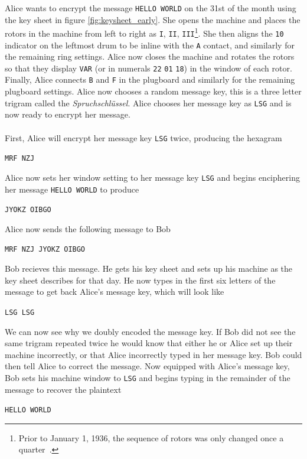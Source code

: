 \noindent Alice wants to encrypt the message \texttt{HELLO WORLD} on
the 31st of the month using the key sheet in figure
\ref{fig:keysheet_early}. She opens the machine and places the rotors in
the machine from left to right as \texttt{I}, \texttt{II},
\texttt{III}\footnote{Prior to January 1, 1936, the sequence of
rotors was only changed once a quarter~\cite[p.~223]{Rejewski1980}.}. She then aligns the
\texttt{10} indicator on the
leftmost drum to be inline with the \texttt{A} contact, and similarly
for the remaining ring settings. Alice now closes the machine and
rotates the rotors so that they display \texttt{VAR} (or in numerals
\texttt{22} \texttt{01} \texttt{18}) in the window of
each rotor. Finally, Alice connects \texttt{B} and \texttt{F} in the
plugboard and similarly for the remaining plugboard settings. Alice
now chooses a random message key, this is a three letter trigram
called the \emph{Spruchschlüssel}. Alice chooses her message key as
\texttt{LSG} and is now ready to encrypt her message.
\\\\First, Alice will encrypt her message key \texttt{LSG} twice,
producing the hexagram
\begin{center}
  \texttt{MRF NZJ}
\end{center}
\noindent Alice now sets her window setting to her message key
\texttt{LSG} and begins enciphering her message \texttt{HELLO WORLD} to produce
\begin{center}
  \texttt{JYOKZ OIBGO}
\end{center}
Alice now sends the following message to Bob
\begin{center}
  \texttt{MRF NZJ JYOKZ OIBGO}
\end{center}
\noindent Bob recieves this message. He gets his key sheet and sets
up his machine as the key sheet describes for that day. He now types
in the first six letters of the message to get back Alice's message
key, which will look like
\begin{center}
  \texttt{LSG LSG}
\end{center}
We can now see why we doubly encoded the message key. If Bob did not
see the same trigram repeated twice he would know that either he or
Alice set up their machine incorrectly, or that Alice incorrectly typed in
her message key. Bob could then tell Alice to correct the message.
Now equipped with Alice's message key, Bob sets his machine window to
\texttt{LSG} and begins typing in the remainder of the message to
recover the plaintext
\begin{center}
  \texttt{HELLO WORLD}
\end{center}
